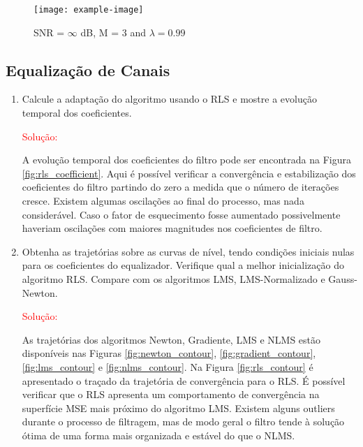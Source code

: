 \begin{figure}[!htp]
    \centering
    \texttt{[image: example-image]}
    \caption{SNR = $\infty$ dB, M = 3 and $\lambda = 0.99$}
    \label{fig:L4Q3_a8}
\end{figure}
\clearpage


\subsection{Equalização de Canais} %
\begin{enumerate}
    
    \item Calcule a adaptação do algoritmo usando o RLS e mostre a evolução temporal dos coeficientes.

        \textcolor{red}{Solução:}

        A evolução temporal dos coeficientes do filtro pode ser encontrada na Figura \ref{fig:rls_coefficient}.  
        Aqui é possível verificar a convergência e estabilização dos coeficientes do filtro partindo do zero a medida que o número 
        de iterações cresce. Existem algumas oscilações ao final do processo, mas nada considerável. Caso o fator de esquecimento fosse
        aumentado possivelmente haveriam oscilações com maiores magnitudes nos coeficientes de filtro. 

    \item Obtenha as trajetórias sobre as curvas de nível, tendo condições iniciais nulas para os
    coeficientes do equalizador. Verifique qual a melhor inicialização do algoritmo RLS. Compare
    com os algoritmos LMS, LMS-Normalizado e Gauss-Newton.

        \textcolor{red}{Solução:}

        As trajetórias dos algoritmos Newton, Gradiente, LMS e NLMS estão disponíveis nas Figuras \ref{fig:newton_contour}, \ref{fig:gradient_contour}, 
        \ref{fig:lms_contour} e \ref{fig:nlms_contour}. Na Figura \ref{fig:rls_contour} é apresentado o traçado da trajetória de convergência para o RLS.
        É possível verificar que o RLS apresenta um comportamento de convergência na superfície MSE mais próximo do algoritmo LMS. Existem alguns outliers durante 
        o processo de filtragem, mas de modo geral o filtro tende à solução ótima de uma forma mais organizada e estável do que o NLMS.


\end{enumerate}
